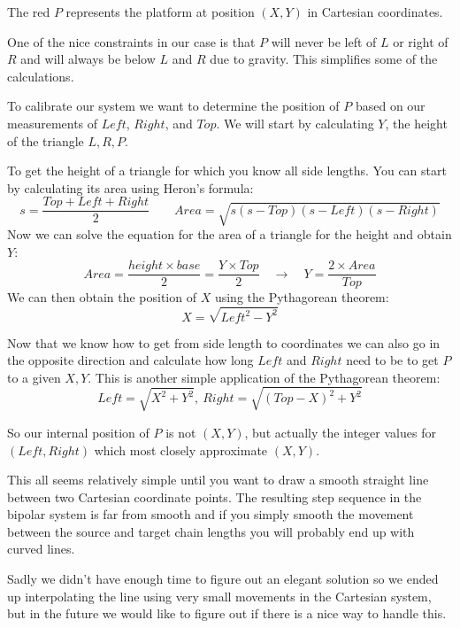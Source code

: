 \documentclass[a4paper,10pt]{article}
\begin{document}
The red $P$ represents the platform at position $(X,Y)$ in Cartesian
coordinates.

One of the nice constraints in our case is that $P$ will never be
left of $L$ or right of $R$ and will always be below $L$ and $R$ due
to gravity. This simplifies some of the calculations.

To calibrate our system we want to determine the position of $P$ based
on our measurements of $Left$, $Right$, and $Top$.
We will start by calculating $Y$, the height of the triangle $L,R,P$.

To get the height of a triangle for which you know all side lengths.
You can start by calculating its area using Heron's formula:
$$s = \frac{Top + Left + Right}{2}\qquad Area = \sqrt{s(s-Top)(s-Left)(s-Right)}$$
%
Now we can solve the equation for the area of a triangle for the height
and obtain $Y$:
$$Area = \frac{height \times base}{2} = \frac{Y \times Top}{2}
\quad \rightarrow \quad Y = \frac{2 \times Area}{Top}$$
%
We can then obtain the position of $X$ using the Pythagorean theorem:
$$X = \sqrt{Left^2 - Y^2}$$

Now that we know how to get from side length to coordinates we can
also go in the opposite direction and calculate how long $Left$ and
$Right$ need to be to get $P$ to a given $X,Y$.
This is another simple application of the Pythagorean theorem:
$$Left = \sqrt{X^2 + Y^2},\ Right = \sqrt{(Top - X)^2 + Y^2}$$

So our internal position of $P$ is not $(X,Y)$, but actually the
integer values for $(Left,Right)$ which most closely approximate $(X,Y)$.

This all seems relatively simple until you want to draw a smooth
straight line between two Cartesian coordinate points.
The resulting step sequence in the bipolar system is far from smooth
and if you simply smooth the movement between the source and target
chain lengths you will probably end up with curved lines.

Sadly we didn't have enough time to figure out an elegant solution so
we ended up interpolating the line using very small movements in the
Cartesian system, but in the future we would like to figure out if
there is a nice way to handle this.


\end{document}
